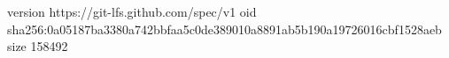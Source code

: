 version https://git-lfs.github.com/spec/v1
oid sha256:0a05187ba3380a742bbfaa5c0de389010a8891ab5b190a19726016cbf1528aeb
size 158492
